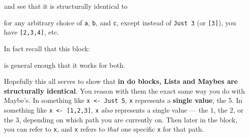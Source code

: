 \documentclass[]{article}
\newenvironment{Shaded}{}{}
\newcommand{\CommentTok}[1]{\textcolor[rgb]{0.38,0.63,0.69}{\textit{#1}}}
\newcommand{\DataTypeTok}[1]{\textcolor[rgb]{0.56,0.13,0.00}{#1}}
\newcommand{\DecValTok}[1]{\textcolor[rgb]{0.25,0.63,0.44}{#1}}
\newcommand{\FunctionTok}[1]{\textcolor[rgb]{0.02,0.16,0.49}{#1}}
\newcommand{\KeywordTok}[1]{\textcolor[rgb]{0.00,0.44,0.13}{\textbf{#1}}}
\newcommand{\NormalTok}[1]{#1}
\newcommand{\OperatorTok}[1]{\textcolor[rgb]{0.40,0.40,0.40}{#1}}
\newcommand{\OtherTok}[1]{\textcolor[rgb]{0.00,0.44,0.13}{#1}}
\begin{document}
and see that it is structurally identical to

\begin{Shaded}
\end{Shaded}

for any arbitrary choice of \texttt{a}, \texttt{b}, and \texttt{c}, except
instead of \texttt{Just\ 3} (or \texttt{{[}3{]}}), you have
\texttt{{[}2,3,4{]}}, etc.

In fact recall that this block:

\begin{Shaded}
\end{Shaded}

is general enough that it works for both.

Hopefully this all serves to show that \textbf{in do blocks, Lists and Maybes
are structurally identical}. You reason with them the exact same way you do with
Maybe's. In something like \texttt{x\ \textless{}-\ Just\ 5}, \texttt{x}
represents a \textbf{single value}, the 5. In something like
\texttt{x\ \textless{}-\ {[}1,2,3{]}}, \texttt{x} \emph{also} represents a
single value --- the 1, the 2, or the 3, depending on which path you are
currently on. Then later in the block, you can refer to \texttt{x}, and
\texttt{x} refers to \emph{that} one specific \texttt{x} for that path.
\end{document}

